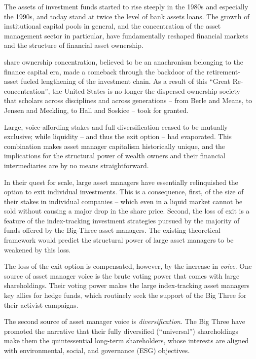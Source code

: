 \documentclass[
]{book}
\begin{document}
The assets of investment funds started to rise steeply in the 1980s and especially the
1990s, and today stand at twice the level of bank assets loans.
The growth of institutional capital pools in general, and the concentration of the asset
management sector in particular, have fundamentally reshaped financial markets and the
structure of financial asset ownership.

share ownership concentration,
believed to be an anachronism belonging to the finance capital era, made a comeback
through the backdoor of the retirement-asset fueled lengthening of the investment chain.
As a result of
this ``Great Re-concentration'', the United States is no longer the dispersed ownership
society that scholars across disciplines and across generations -- from Berle and Means,
to Jensen and Meckling, to Hall and Soskice -- took for granted.

Large, voice-affording stakes and full diversification
ceased to be mutually exclusive; while liquidity -- and thus the exit option -- had
evaporated. This combination makes asset manager capitalism historically unique, and
the implications for the structural power of wealth owners and their financial
intermediaries are by no means straightforward.

In their quest for scale, large asset
managers have essentially relinquished the option to exit individual investments.
This is a consequence, first, of the size of
their stakes in individual companies -- which even in a liquid market cannot be sold
without causing a major drop in the share price. Second, the loss of exit is a feature of
the index-tracking investment strategies pursued by the majority of funds offered by the
Big-Three asset managers. The existing theoretical framework would predict the
structural power of large asset managers to be weakened by this loss.

The loss of the exit option is compensated, however, by the increase in \emph{voice}. One source
of asset manager voice is the brute voting power that comes with large shareholdings.
Their voting power makes the large index-tracking asset managers key allies for hedge
funds, which routinely seek the support of the Big Three for their activist campaigns.

The second source of asset manager voice is \emph{diversification}. The Big Three have promoted
the narrative that their fully diversified (``universal'') shareholdings make them the
quintessential long-term shareholders, whose interests are aligned with environmental,
social, and governance (ESG) objectives.
\end{document}
